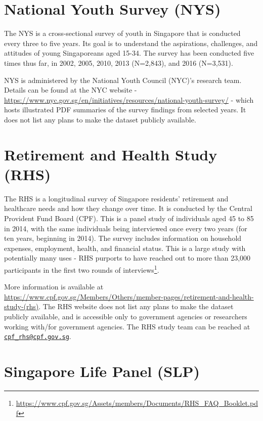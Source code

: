 \documentclass[
  openany]{book}
\begin{document}
\hypertarget{nys}{%
\section{National Youth Survey (NYS)}\label{nys}}

The NYS is a cross-sectional survey of youth in Singapore that is conducted every three to five years. Its goal is to understand the aspirations, challenges, and attitudes of young Singaporeans aged 15-34. The survey has been conducted five times thus far, in 2002, 2005, 2010, 2013 (N=2,843), and 2016 (N=3,531).

NYS is administered by the National Youth Council (NYC)'s research team. Details can be found at the NYC website - \url{https://www.nyc.gov.sg/en/initiatives/resources/national-youth-survey/} - which hosts illustrated PDF summaries of the survey findings from selected years. It does not list any plans to make the dataset publicly available.

\hypertarget{rhs}{%
\section{Retirement and Health Study (RHS)}\label{rhs}}

The RHS is a longitudinal survey of Singapore residents' retirement and healthcare needs and how they change over time. It is conducted by the Central Provident Fund Board (CPF). This is a panel study of individuals aged 45 to 85 in 2014, with the same individuals being interviewed once every two years (for ten years, beginning in 2014). The survey includes information on household expenses, employment, health, and financial status. This is a large study with potentially many uses - RHS purports to have reached out to more than 23,000 participants in the first two rounds of interviews\footnote{\url{https://www.cpf.gov.sg/Assets/members/Documents/RHS_FAQ_Booklet.pdf}}.

More information is available at \url{https://www.cpf.gov.sg/Members/Others/member-pages/retirement-and-health-study-(rhs)}. The RHS website does not list any plans to make the dataset publicly available, and is accessible only to government agencies or researchers working with/for government agencies. The RHS study team can be reached at \href{mailto:cpf_rhs@cpf.gov.sg}{\nolinkurl{cpf\_rhs@cpf.gov.sg}}.

\hypertarget{slp}{%
\section{Singapore Life Panel (SLP)}\label{slp}}
\end{document}

